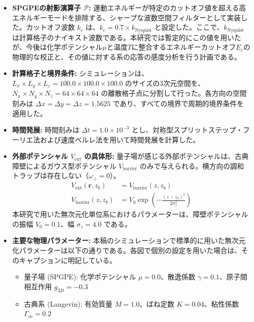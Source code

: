 \documentclass[a4paper,11pt,ja=standard,lualatex]{bxjsarticle}
\begin{document}
\begin{itemize}
    \item \textbf{SPGPEの射影演算子 $\mathcal{P}$:} 運動エネルギーが特定のカットオフ値を超える高エネルギーモードを排除する、シャープな波数空間フィルターとして実装した。カットオフ波数 $k_c$ は、$k_c = 0.7 \times k_{\mathrm{Nyquist}}$ と設定した。ここで、$k_{\mathrm{Nyquist}}$は計算格子のナイキスト波数である。本研究では暫定的にこの値を用いたが、今後は化学ポテンシャル$\mu$と温度$T$に整合するエネルギーカットオフ$E_c$の物理的な校正と、その値に対する系の応答の感度分析を行う計画である。

    \item \textbf{計算格子と境界条件:} シミュレーションは、$L_x \times L_y \times L_z = 100.0 \times 100.0 \times 100.0$ のサイズの3次元空間を、$N_x \times N_y \times N_z = 64 \times 64 \times 64$ の離散格子点に分割して行った。各方向の空間刻みは $\Delta x = \Delta y = \Delta z = 1.5625$ であり、すべての境界で周期的境界条件を適用した。

    \item \textbf{時間発展:} 時間刻みは $\Delta t = 1.0 \times 10^{-3}$ とし、対称型スプリットステップ・フーリエ法および速度ベルレ法を用いて時間発展を計算した。

    \item \textbf{外部ポテンシャル $V_{\mathrm{ext}}$ の具体形:} 量子場が感じる外部ポテンシャルは、古典障壁によるガウス型ポテンシャル $V_{\mathrm{barrier}}$ のみで与えられる。横方向の調和トラップは存在しない（$\omega_{\perp}=0$）。
    \begin{align}
        V_{\mathrm{ext}}(\mathbf{r}, z_b) &= V_{\mathrm{barrier}}(z, z_b) \\
        V_{\mathrm{barrier}}(z, z_b) &= V_0 \exp\left(-\frac{(z - z_b)^2}{2\sigma_z^2}\right)
    \end{align}
    本研究で用いた無次元化単位系におけるパラメーターは、障壁ポテンシャルの振幅 $V_0=0.1$、幅 $\sigma_z=4.0$ である。
    
    \item \textbf{主要な物理パラメーター:} 本稿のシミュレーションで標準的に用いた無次元化パラメーターは以下の通りである。各図で個別の設定を用いた場合は、そのキャプションに明記している。
    \begin{itemize}
        \item 量子場 (SPGPE): 化学ポテンシャル $\mu=0.0$、散逸係数 $\gamma=0.1$、原子間相互作用 $g_{3D}=-0.3$
        \item 古典系 (Langevin): 有効質量 $M=1.0$、ばね定数 $K=0.04$、粘性係数 $\Gamma_m=0.2$
    \end{itemize}
    

\end{itemize}
\end{document}
